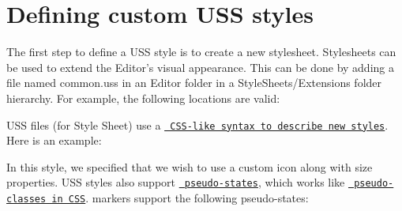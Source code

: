\chapter{Defining custom USS styles}
\hypertarget{md__library_2_package_cache_2com_8unity_8timeline_0d1_87_86_2_documentation_0i_2uss__styles}{}\label{md__library_2_package_cache_2com_8unity_8timeline_0d1_87_86_2_documentation_0i_2uss__styles}
\label{md__library_2_package_cache_2com_8unity_8timeline_0d1_87_86_2_documentation_0i_2uss__styles_autotoc_md1264}%
%
 The first step to define a USS style is to create a new stylesheet. Stylesheets can be used to extend the Editor’s visual appearance. This can be done by adding a file named {\ttfamily common.\+uss} in an Editor folder in a {\ttfamily Style\+Sheets/\+Extensions} folder hierarchy. For example, the following locations are valid\+:


\begin{DoxyCode}{0}

\end{DoxyCode}


USS files (for  Style Sheet) use a \href{https://docs.unity3d.com/Manual/UIE-USS.html}{\texttt{ CSS-\/like syntax to describe new styles}}. Here is an example\+:


\begin{DoxyCode}{0}
\DoxyCodeLine{\{}
\DoxyCodeLine{\}}

\end{DoxyCode}


In this style, we specified that we wish to use a custom icon along with size properties. USS styles also support \href{https://docs.unity3d.com/Manual/UIE-USS-Selectors.html}{\texttt{ pseudo-\/states}}, which works like \href{https://developer.mozilla.org/en-US/docs/Web/CSS/Pseudo-classes}{\texttt{ pseudo-\/classes in CSS}}.  markers support the following pseudo-\/states\+:


